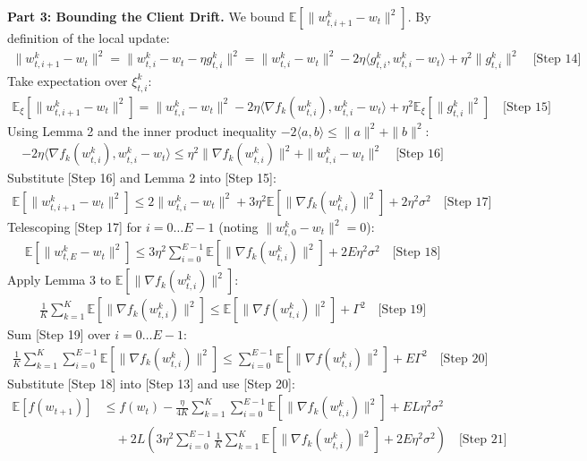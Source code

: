 \documentclass{article}
\begin{document}
\textbf{Part 3: Bounding the Client Drift.}
We bound $\mathbb{E}[\|w_{t,i+1}^k - w_t\|^2]$. By definition of the local update:
\begin{align}
    \|w_{t,i+1}^k - w_t\|^2 = \|w_{t,i}^k - w_t - \eta g_{t,i}^k\|^2 = \|w_{t,i}^k - w_t\|^2 - 2\eta \langle g_{t,i}^k, w_{t,i}^k - w_t \rangle + \eta^2 \|g_{t,i}^k\|^2 \quad \text{[Step 14]}
\end{align}
Take expectation over $\xi_{t,i}^k$:
\begin{align}
    \mathbb{E}_{\xi}[\|w_{t,i+1}^k - w_t\|^2] = \|w_{t,i}^k - w_t\|^2 - 2\eta \langle \nabla f_k(w_{t,i}^k), w_{t,i}^k - w_t \rangle + \eta^2 \mathbb{E}_{\xi}[\|g_{t,i}^k\|^2] \quad \text{[Step 15]}
\end{align}
Using Lemma 2 and the inner product inequality $-2\langle a, b \rangle \leq \|a\|^2 + \|b\|^2$:
\begin{align}
    - 2\eta \langle \nabla f_k(w_{t,i}^k), w_{t,i}^k - w_t \rangle \leq \eta^2 \|\nabla f_k(w_{t,i}^k)\|^2 + \|w_{t,i}^k - w_t\|^2 \quad \text{[Step 16]}
\end{align}
Substitute [Step 16] and Lemma 2 into [Step 15]:
\begin{align}
    \mathbb{E}[\|w_{t,i+1}^k - w_t\|^2] \leq 2\|w_{t,i}^k - w_t\|^2 + 3\eta^2 \mathbb{E}[\|\nabla f_k(w_{t,i}^k)\|^2] + 2\eta^2 \sigma^2 \quad \text{[Step 17]}
\end{align}
Telescoping [Step 17] for $i=0 \dots E-1$ (noting $\|w_{t,0}^k - w_t\|^2 = 0$):
\begin{align}
    \mathbb{E}[\|w_{t,E}^k - w_t\|^2] \leq 3\eta^2 \sum_{i=0}^{E-1} \mathbb{E}[\|\nabla f_k(w_{t,i}^k)\|^2] + 2 E \eta^2 \sigma^2 \quad \text{[Step 18]}
\end{align}
Apply Lemma 3 to $\mathbb{E}[\|\nabla f_k(w_{t,i}^k)\|^2]$:
\begin{align}
    \frac{1}{K}\sum_{k=1}^K \mathbb{E}[\|\nabla f_k(w_{t,i}^k)\|^2] \leq \mathbb{E}[\|\nabla f(w_{t,i}^k)\|^2] + \Gamma^2 \quad \text{[Step 19]}
\end{align}
Sum [Step 19] over $i=0 \dots E-1$:
\begin{align}
    \frac{1}{K}\sum_{k=1}^K \sum_{i=0}^{E-1} \mathbb{E}[\|\nabla f_k(w_{t,i}^k)\|^2] \leq \sum_{i=0}^{E-1} \mathbb{E}[\|\nabla f(w_{t,i}^k)\|^2] + E \Gamma^2 \quad \text{[Step 20]}
\end{align}
Substitute [Step 18] into [Step 13] and use [Step 20]:
\begin{align}
    \mathbb{E}[f(w_{t+1})] &\leq f(w_t) - \frac{\eta}{4 K} \sum_{k=1}^K \sum_{i=0}^{E-1} \mathbb{E}[\|\nabla f_k(w_{t,i}^k)\|^2] + E L \eta^2 \sigma^2 \\ 
    &\quad + 2L \left( 3\eta^2 \sum_{i=0}^{E-1} \frac{1}{K} \sum_{k=1}^K \mathbb{E}[\|\nabla f_k(w_{t,i}^k)\|^2] + 2 E \eta^2 \sigma^2 \right) \quad \text{[Step 21]}
\end{align}
\end{document}
